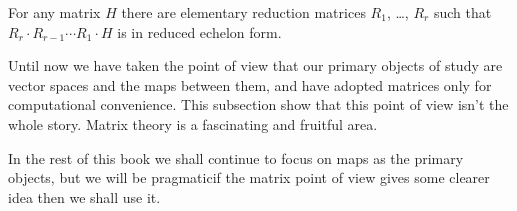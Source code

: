 \begin{corollary} \label{cor:ReducViaMatrices}
For any matrix \( H \) there are elementary reduction matrices
\( R_1 \), \ldots, \( R_r \) such that
\( R_r\cdot R_{r-1}\cdots R_1\cdot H \)
is in reduced echelon form.
\end{corollary}

Until now we have taken the point of view that our primary objects of study
are vector spaces and the maps between them, and
have adopted matrices only for computational convenience.
This subsection show that this point of view isn't the whole story.
Matrix theory is a fascinating and fruitful area.

In the rest of this book we shall continue to focus on maps as the primary
objects, but we will be pragmatic\Dash if the matrix point of view gives some
clearer idea then we shall use it.


